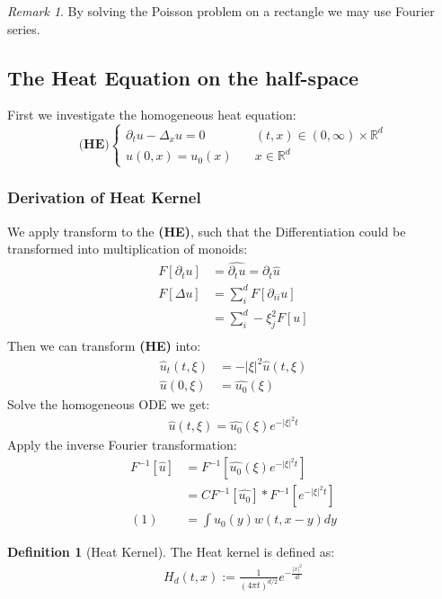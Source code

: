 \documentclass[a4paper,11pt,oneside,fleqn]{book}
\theoremstyle{definition}
\newtheorem{definition}{Definition}[section]
\theoremstyle{remark}
\newtheorem*{remark}{Remark}
\begin{document}
\begin{remark}
By solving the Poisson problem on a rectangle we may use Fourier series.
\end{remark}


\subsection{The Heat Equation on the  half-space}
First we investigate the homogeneous heat equation:
\begin{equation} 
\textbf{(HE)}\left\{
\begin{aligned}
	\partial_t u - \Delta_x u = 0 \quad &(t, x) \in (0, \infty) \times \mathbb{R}^d\\
	u(0, x) = u_0(x) \quad &x \in \mathbb{R}^d
\end{aligned}
\right.	
\end{equation}


\subsubsection*{Derivation of Heat Kernel}
We apply transform to the \textbf{(HE)}, such that the Differentiation could be transformed into multiplication of monoids:
\begin{align*}
	F[\partial_t u] &= \hat{\partial_t u} = \partial_t \hat{u} \\
	F[\Delta u] &= \sum_i^d F[\partial_{ii} u]\\
	&= \sum_i^d -\xi_j^2 F[u]\\
\end{align*}
Then we can transform \textbf{(HE)} into:
\begin{align*}
	\hat{u}_t(t, \xi) &= -|\xi|^2 \hat{u}(t, \xi) \\
	\hat{u}(0, \xi) &= \hat{u_0}(\xi)
\end{align*}
Solve the homogeneous ODE we get:
\begin{align*}
	\hat{u}(t, \xi) = \hat{u_0}(\xi) e^{-|\xi|^2t}
\end{align*}
Apply the inverse Fourier transformation:
\begin{align*}
	F^{-1}[\hat{u}] &= F^{-1}[\hat{u_0}(\xi) e^{-|\xi|^2t}]\\
	&= C F^{-1}[\hat{u_0}] * F^{-1}[e^{-|\xi|^2 t}]\\
	(1)&= \int u_0(y)w(t, x-y)dy
\end{align*}

\begin{definition}[Heat Kernel]	
The Heat kernel is defined as:
\begin{align*}
	H_d(t, x) := \frac{1}{(4\pi t)^{d/2}} e^{-\frac{|x|^2}{4t}}
\end{align*}
\end{definition}
\end{document}
